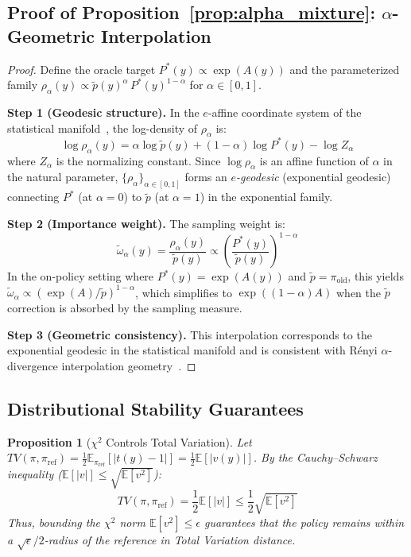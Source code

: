 \documentclass[11pt]{article}
\newtheorem{proposition}[theorem]{Proposition}
\theoremstyle{definition}
\theoremstyle{remark}
\newcommand{\E}{\mathbb{E}}
\newcommand{\piref}{\pi_{\mathrm{ref}}}
\begin{document}
\subsection{Proof of Proposition~\ref{prop:alpha_mixture}: $\alpha$-Geometric Interpolation}
\label{app:alpha_proof}

\begin{proof}
Define the oracle target $P^*(y) \propto \exp(A(y))$ and the parameterized family $\rho_\alpha(y) \propto \tilde{p}(y)^\alpha\, P^*(y)^{1-\alpha}$ for $\alpha \in [0,1]$.

\textbf{Step 1 (Geodesic structure).}
In the $e$-affine coordinate system of the statistical manifold~\cite{Amari2016}, the log-density of $\rho_\alpha$ is:
\begin{equation}
\log \rho_\alpha(y) = \alpha\log \tilde{p}(y) + (1-\alpha) \log P^*(y) - \log Z_\alpha
\end{equation}
where $Z_\alpha$ is the normalizing constant. Since $\log \rho_\alpha$ is an affine function of $\alpha$ in the natural parameter, $\{\rho_\alpha\}_{\alpha \in [0,1]}$ forms an \emph{$e$-geodesic} (exponential geodesic) connecting $P^*$ (at $\alpha=0$) to $\tilde{p}$ (at $\alpha=1$) in the exponential family.

\textbf{Step 2 (Importance weight).}
The sampling weight is:
\begin{equation}
\tilde{\omega}_\alpha(y) = \frac{\rho_\alpha(y)}{\tilde{p}(y)} \propto \left(\frac{P^*(y)}{\tilde{p}(y)}\right)^{1-\alpha}
\end{equation}
In the on-policy setting where $P^*(y) = \exp(A(y))$ and $\tilde{p} = \pi_{\mathrm{old}}$, this yields $\tilde{\omega}_\alpha \propto (\exp(A)/\tilde{p})^{1-\alpha}$, which simplifies to $\exp((1-\alpha)A)$ when the $\tilde{p}$ correction is absorbed by the sampling measure.

\textbf{Step 3 (Geometric consistency).}
This interpolation corresponds to the exponential geodesic in the statistical manifold and is consistent with R\'enyi $\alpha$-divergence interpolation geometry~\cite{Amari2016}.
\end{proof}

\subsection{Distributional Stability Guarantees}
\begin{proposition}[$\chi^2$ Controls Total Variation]
Let $TV(\pi, \piref) = \frac{1}{2} \E_{\piref}[|t(y)-1|] = \frac{1}{2}\E[|v(y)|]$. By the Cauchy--Schwarz inequality ($\E[|v|] \le \sqrt{\E[v^2]}$):
\begin{equation}
    TV(\pi, \piref) = \frac{1}{2} \E[|v|] \le \frac{1}{2} \sqrt{\E[v^2]}
\end{equation}
Thus, bounding the $\chi^2$ norm $\E[v^2] \le \epsilon$ guarantees that the policy remains within a $\sqrt{\epsilon}/2$-radius of the reference in Total Variation distance.
\end{proposition}
\end{document}
